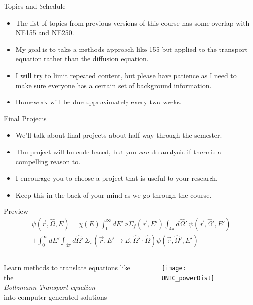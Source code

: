 \documentclass[xcolor=x11names,compress]{beamer}
\renewcommand{\(}{\begin{columns}}
\renewcommand{\)}{\end{columns}}
\newcommand{\<}[1]{\begin{column}{#1}}
\renewcommand{\>}{\end{column}}
\newcommand{\Macro}{\ensuremath{\Sigma}}
\newcommand{\vOmega}{\ensuremath{\hat{\Omega}}}
\begin{document}
\begin{frame}{Topics and Schedule}
\begin{itemize}
\item The list of topics from previous versions of this course has some overlap with NE155 and NE250.
\item My goal is to take a methods approach like 155 but applied to the transport equation rather than the diffusion equation.
\item I will try to limit repeated content, but please have patience as I need to make sure everyone has a certain set of background information.
\item Homework will be due approximately every two weeks.
\end{itemize}
\end{frame}


\begin{frame}{Final Projects}
\begin{itemize}
\item We'll talk about final projects about half way through the semester.
\item The project will be code-based, but you \textit{can} do analysis if there is a compelling reason to.
\item I encourage you to choose a project that is useful to your research.
\item Keep this in the back of your mind as we go through the course.
\end{itemize}
\end{frame}

\begin{frame}{Preview}
\begin{align}
  [\vOmega \cdot \nabla + \Macro(\vec{r}, E)] &\psi(\vec{r}, \vOmega, E)  = \chi(E) \int_0^{\infty} dE' \:\nu \Macro_{f}(\vec{r}, E') \int_{4\pi} d\vOmega' \:\psi(\vec{r}, \vOmega', E')  \nonumber \\
   &+ \int_0^{\infty} dE' \int_{4\pi} d\vOmega' \:\Macro_{s}(\vec{r}, E' \to E, \vOmega' \cdot \vOmega) \psi(\vec{r}, \vOmega', E')  \nonumber
\end{align}
\vspace{-2em}
\begin{columns}
  \begin{column}{0.5\textwidth}
    Learn methods to translate equations like the \\\emph{Boltzmann Transport equation} \\into computer-generated solutions
  \end{column}
  \begin{column}{0.5\textwidth}
    \begin{figure}
    \texttt{[image: UNIC\_powerDist]}
    \end{figure}
  \end{column}
\end{columns}
\end{frame}
\end{document}
